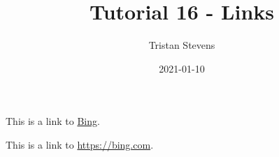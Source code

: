 \documentclass{article}
\title{Tutorial 16 - Links}
\date{2021-01-10}
\author{Tristan Stevens}
\begin{document}
\maketitle
\newpage

This is a link to \href{https://bing.com}{Bing}.

This is a link to \url{https://bing.com}.
\end{document}

